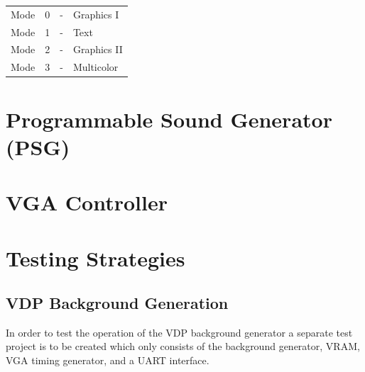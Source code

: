\documentclass{article}
\begin{document}
\begin{table}[H]
    \centering
    \begin{tabular}{l c c l}
        Mode & 0 & - & Graphics I   \\
        Mode & 1 & - & Text         \\
        Mode & 2 & - & Graphics II  \\
        Mode & 3 & - & Multicolor   \\
    \end{tabular}
\end{table}

\section{Programmable Sound Generator (PSG)}
\section{VGA Controller}

\newpage
\section{Testing Strategies}
\subsection{VDP Background Generation}

In order to test the operation of the VDP background generator a separate test
project is to be created which only consists of the background generator, VRAM,
VGA timing generator, and a UART interface.
\end{document}
